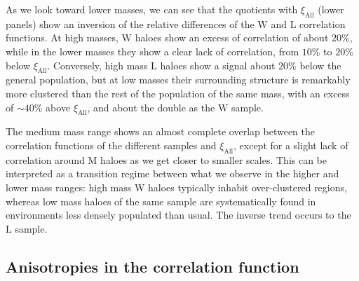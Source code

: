 \documentclass[fleqn,usenatbib]{mnras}
\newcommand{\Wh}{\mathrm{W}}
\newcommand{\Lh}{\mathrm{L}}
\newcommand{\Mh}{\mathrm{M}}
\begin{document}
As we look toward lower masses, we can see that the quotients with $\xi_\mathrm{All}$ (lower panels) show an inversion of the relative differences of the $\Wh$ and $\Lh$ correlation functions. At high masses, $\Wh$ haloes show an excess of correlation of about $20\%$, while in the lower masses they show a clear lack of correlation, from $10\%$ to $20\%$ below $\xi_\mathrm{All}$. Conversely, high mass $\Lh$ haloes show a signal about $20\%$ below the general population, but at low masses their surrounding structure is remarkably more clustered than the rest of the population of the same mass, with an excess of $\sim 40\%$ above $\xi_\mathrm{All}$, and about the double as the $\Wh$ sample.

The medium mass range shows an almost complete overlap between the correlation functions of the different samples and $\xi_\mathrm{All}$, except for a slight lack of correlation around $\Mh$ haloes as we get closer to  smaller scales. This can be interpreted as a transition regime between what we observe in the higher and lower mass ranges: high mass $\Wh$ haloes typically inhabit over-clustered regions, whereas low mass haloes of the same sample are systematically found in environments less densely populated than usual. The inverse trend occurs to the $\Lh$ sample.

\subsection{Anisotropies in the correlation function}
\label{anisotropic_xi}
\end{document}
